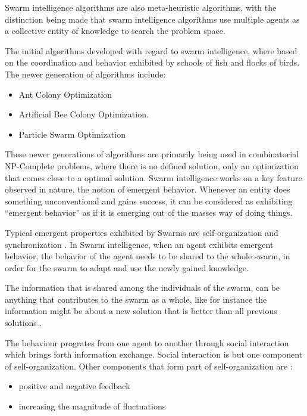 Swarm intelligence algorithms are also meta-heuristic algorithms, with the distinction being made that swarm intelligence algorithms use multiple agents as a collective entity of knowledge to search the problem space\cite{SwarmArt,ChaoticSwarmIntel,BeeJobShop,CompuIntelligenceIntro,FundamentalSwarm}.

The initial algorithms developed with regard to swarm intelligence, where based on the coordination and behavior exhibited by schools of fish and flocks of birds. The newer generation of algorithms include\cite{SwarmArt,ChaoticSwarmIntel,BeeJobShop}:
\begin{itemize}
\item Ant Colony Optimization
\item Artificial Bee Colony Optimization.
\item Particle Swarm Optimization 
\end{itemize}

These newer generations of algorithms are primarily being used in combinatorial NP-Complete problems, where there is no defined solution, only an optimization that comes close to a optimal solution. Swarm intelligence works on a key feature observed in nature, the notion of emergent behavior\cite{SwarmArt,CompuIntelligenceIntro,FundamentalSwarm}. Whenever an entity does something unconventional and gains success, it can be considered as exhibiting “emergent behavior” as if it is emerging out of the masses way of doing things\cite{SwarmArt,CompuIntelligenceIntro,FundamentalSwarm}. 

Typical emergent properties exhibited by Swarms are self-organization and synchronization \cite{SwarmArt}. In Swarm intelligence, when an agent exhibits emergent behavior, the behavior of the agent needs to be shared to the whole swarm, in order for the swarm to adapt and use the newly gained knowledge\cite{SwarmArt,ChaoticSwarmIntel,CompuIntelligenceIntro,FundamentalSwarm}.

The information that is shared among the individuals of the swarm, can be anything that contributes to the swarm as a whole, like for instance the information might be about a new solution that is better than all previous solutions \cite{SwarmArt,ChaoticSwarmIntel,CompuIntelligenceIntro,FundamentalSwarm}. 

The behaviour progrates from one agent to another through social interaction which brings forth information exchange\cite{SwarmArt}. Social interaction is but one component of self-organization. Other components that form part of self-organization are \cite{SwarmArt}:
\begin{itemize}
\item positive and negative feedback
\item increasing the magnitude of fluctuations
\end{itemize}

